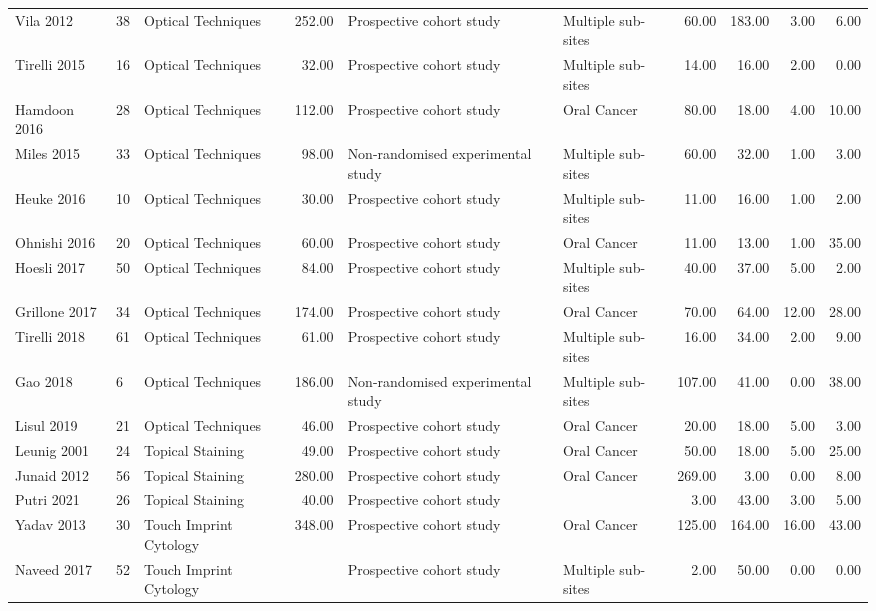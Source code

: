\begin{table}[ht]
\begin{tabular}{lllrllrrrr}
  Vila 2012 & 38 & Optical Techniques & 252.00 & Prospective cohort study & Multiple sub-sites & 60.00 & 183.00 & 3.00 & 6.00 \\ 
  Tirelli 2015 & 16 & Optical Techniques & 32.00 & Prospective cohort study & Multiple sub-sites & 14.00 & 16.00 & 2.00 & 0.00 \\ 
  Hamdoon 2016 & 28 & Optical Techniques & 112.00 & Prospective cohort study & Oral Cancer & 80.00 & 18.00 & 4.00 & 10.00 \\ 
  Miles 2015 & 33 & Optical Techniques & 98.00 & Non-randomised experimental study & Multiple sub-sites & 60.00 & 32.00 & 1.00 & 3.00 \\ 
  Heuke 2016 & 10 & Optical Techniques & 30.00 & Prospective cohort study & Multiple sub-sites & 11.00 & 16.00 & 1.00 & 2.00 \\ 
  Ohnishi 2016 & 20 & Optical Techniques & 60.00 & Prospective cohort study & Oral Cancer & 11.00 & 13.00 & 1.00 & 35.00 \\ 
  Hoesli 2017 & 50 & Optical Techniques & 84.00 & Prospective cohort study & Multiple sub-sites & 40.00 & 37.00 & 5.00 & 2.00 \\ 
  Grillone 2017 & 34 & Optical Techniques & 174.00 & Prospective cohort study & Oral Cancer & 70.00 & 64.00 & 12.00 & 28.00 \\ 
  Tirelli 2018 & 61 & Optical Techniques & 61.00 & Prospective cohort study & Multiple sub-sites & 16.00 & 34.00 & 2.00 & 9.00 \\ 
  Gao 2018 & 6 & Optical Techniques & 186.00 & Non-randomised experimental study & Multiple sub-sites & 107.00 & 41.00 & 0.00 & 38.00 \\ 
  Lisul 2019 & 21 & Optical Techniques & 46.00 & Prospective cohort study & Oral Cancer & 20.00 & 18.00 & 5.00 & 3.00 \\ 
  Leunig 2001 & 24 & Topical Staining & 49.00 & Prospective cohort study & Oral Cancer & 50.00 & 18.00 & 5.00 & 25.00 \\ 
  Junaid 2012 & 56 & Topical Staining & 280.00 & Prospective cohort study & Oral Cancer & 269.00 & 3.00 & 0.00 & 8.00 \\ 
  Putri 2021 & 26 & Topical Staining & 40.00 & Prospective cohort study &  & 3.00 & 43.00 & 3.00 & 5.00 \\ 
  Yadav 2013 & 30 & Touch Imprint Cytology & 348.00 & Prospective cohort study & Oral Cancer & 125.00 & 164.00 & 16.00 & 43.00 \\ 
  Naveed 2017 & 52 & Touch Imprint Cytology &  & Prospective cohort study & Multiple sub-sites & 2.00 & 50.00 & 0.00 & 0.00 \\ 

\end{tabular}
\end{table}
